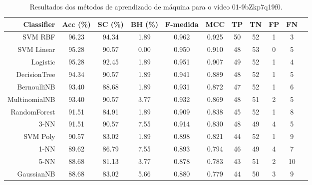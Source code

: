 \begin{table}[!htb]
\centering
\caption{Resultados dos métodos de aprendizado de máquina para o vídeo 01-9bZkp7q19f0.}
\label{tab:01-9bZkp7q19f0}
\begin{tabular}{r|c|c|c|c|c|c|c|c|c|c}
\hline\hline
Classifier & Acc (\%) & SC (\%) & BH (\%) & F-medida & MCC & TP & TN & FP & FN \\ \hline
SVM RBF & 96.23 & 94.34 & 1.89 & 0.962 & 0.925 & 50 & 52 & 1 & 3 \\ 
SVM Linear & 95.28 & 90.57 & 0.00 & 0.950 & 0.910 & 48 & 53 & 0 & 5 \\ 
Logistic & 95.28 & 92.45 & 1.89 & 0.951 & 0.907 & 49 & 52 & 1 & 4 \\ 
DecisionTree & 94.34 & 90.57 & 1.89 & 0.941 & 0.889 & 48 & 52 & 1 & 5 \\ 
BernoulliNB & 93.40 & 88.68 & 1.89 & 0.931 & 0.872 & 47 & 52 & 1 & 6 \\ 
MultinomialNB & 93.40 & 90.57 & 3.77 & 0.932 & 0.869 & 48 & 51 & 2 & 5 \\ 
RandomForest & 91.51 & 84.91 & 1.89 & 0.909 & 0.838 & 45 & 52 & 1 & 8 \\ 
3-NN & 91.51 & 90.57 & 7.55 & 0.914 & 0.830 & 48 & 49 & 4 & 5 \\ 
SVM Poly & 90.57 & 83.02 & 1.89 & 0.898 & 0.821 & 44 & 52 & 1 & 9 \\ 
1-NN & 89.62 & 86.79 & 7.55 & 0.893 & 0.794 & 46 & 49 & 4 & 7 \\ 
5-NN & 88.68 & 81.13 & 3.77 & 0.878 & 0.783 & 43 & 51 & 2 & 10 \\ 
GaussianNB & 88.68 & 83.02 & 5.66 & 0.880 & 0.779 & 44 & 50 & 3 & 9 \\ 
\hline\hline
\end{tabular}
\end{table}
